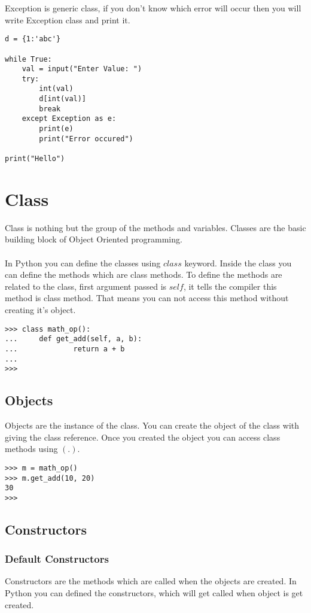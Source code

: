\documentclass[letterpaper,12pt]{book}
\begin{document}
Exception is generic class, if you don't know which error will occur then you will write Exception class and print it.
\begin{lstlisting}
d = {1:'abc'}

while True:
    val = input("Enter Value: ")
    try:
        int(val)
        d[int(val)]
        break
    except Exception as e:
        print(e)
        print("Error occured")

print("Hello")
\end{lstlisting}
\section{Class}
Class is nothing but the group of the methods and variables. Classes are the basic building block of Object Oriented programming. 
\paragraph{}
In Python you can define the classes using $class$ keyword. Inside the class you can define the methods which are class methods. To define the methods are related to the class, first argument passed is $self$, it tells the compiler this method is class method. That means you can not access this method without creating it's object. 

\begin{lstlisting}
>>> class math_op():
...     def get_add(self, a, b):
...             return a + b
... 
>>> 
\end{lstlisting}
\subsection{Objects}
Objects are the instance of the class. You can create the object of the class with giving the class reference. Once you created the object you can access class methods using $(.)$.

\begin{lstlisting}
>>> m = math_op()
>>> m.get_add(10, 20)
30
>>>
\end{lstlisting}
\subsection{Constructors}
\subsubsection{Default Constructors}
Constructors are the methods which are called when the objects are created. In Python you can defined the constructors, which will get called when object is get created.
\end{document}
